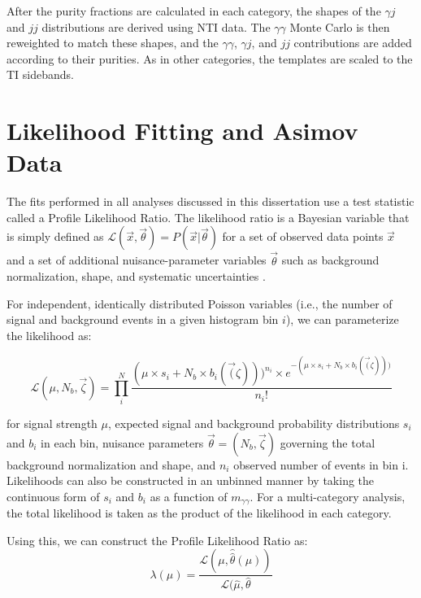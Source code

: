 After the purity fractions are calculated in each category, the shapes of the $\gamma j$ and $jj$ distributions are derived using NTI data. The $\gamma \gamma$ Monte Carlo is then reweighted to match these shapes, and the $\gamma \gamma$, $\gamma j$, and $jj$ contributions are added according to their purities. As in other categories, the templates are scaled to the TI sidebands. 

\section{Likelihood Fitting and Asimov Data} \label{sec:likelihoodfit} 

The fits performed in all analyses discussed in this dissertation use a test statistic called a Profile Likelihood Ratio. The likelihood ratio  is a Bayesian variable that is simply defined as $\mathcal{L}(\vec{x},\vec{\theta}) = P(\vec{x} | \vec{\theta})$  for a set of observed data points $\vec{x}$ and a set of additional nuisance-parameter variables $\vec{\theta}$ such as background normalization, shape, and systematic uncertainties \cite{Cowan}.

For independent, identically distributed Poisson variables (i.e., the number of signal and background events in a given histogram bin $i$), we can parameterize the likelihood as:

\begin{equation}
\mathcal{L}(\mu, N_{b}, \vec{\zeta}) = \prod_{i}^{N}{\frac{(\mu \times s_{i}+ N_{b} \times b_{i}(\vec(\zeta)))^{n_{i}} \times e^{-(\mu \times s_{i}+ N_{b} \times b_{i}(\vec(\zeta))) }}{n_{i}!}}
\end{equation}

for signal strength $\mu$, expected signal and background probability distributions $s_{i}$ and $b_{i}$ in each bin, nuisance parameters $\vec{\theta} = (N_{b}, \vec{\zeta})$ governing the total background normalization and shape, and $n_{i}$ observed number of events in bin i. Likelihoods can also be constructed in an unbinned manner by taking the continuous form of $s_{i}$ and $b_{i}$ as a function of $m_{\gamma\gamma}$. For a multi-category analysis, the total likelihood is taken as the product of the likelihood in each category.

Using this, we can construct the Profile Likelihood Ratio as: 
\begin{equation}
\lambda(\mu) = \frac{\mathcal{L}(\mu, \hat{\hat{\theta}}(\mu))} {\mathcal{L}(\hat{\mu}, \hat{\theta}}
\end{equation}


